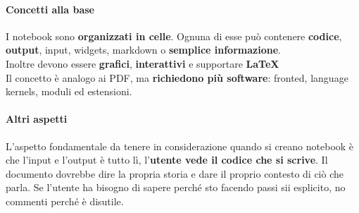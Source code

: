\documentclass[10pt]{article}
\begin{document}
\paragraph{Concetti alla base} I notebook sono \textbf{organizzati in celle}. Ognuna di esse può contenere \textbf{codice}, \textbf{output}, input, widgets, markdown o \textbf{semplice informazione}.\\
Inoltre devono essere \textbf{grafici}, \textbf{interattivi} e supportare \textbf{\LaTeX}\\
Il concetto è analogo ai PDF, ma \textbf{richiedono più software}: fronted, language kernels, moduli ed estensioni.
\paragraph{Altri aspetti} L'aspetto fondamentale da tenere in considerazione quando si creano notebook è che l'input e l'output è tutto lì, l'\textbf{utente vede il codice che si scrive}. Il documento dovrebbe dire la propria storia e dare il proprio contesto di ciò che parla. Se l'utente ha bisogno di sapere perché sto facendo passi sii esplicito, no commenti perché è disutile.
\end{document}
